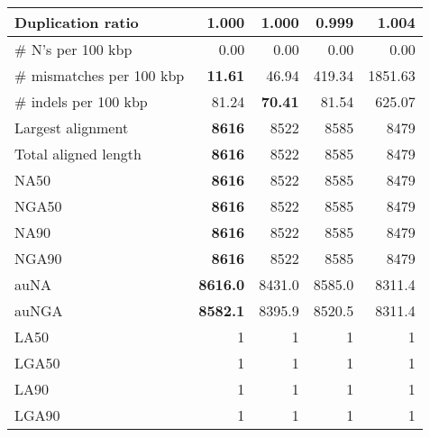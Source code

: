 \documentclass[12pt,a4paper]{article}
\begin{document}
\begin{table}[ht]
\begin{center}
\begin{tabular}{|l*{4}{|r}|}
Duplication ratio & 1.000 & 1.000 & {\bf 0.999} & 1.004 \\ \hline
\# N's per 100 kbp & 0.00 & 0.00 & 0.00 & 0.00 \\ \hline
\# mismatches per 100 kbp & {\bf 11.61} & 46.94 & 419.34 & 1851.63 \\ \hline
\# indels per 100 kbp & 81.24 & {\bf 70.41} & 81.54 & 625.07 \\ \hline
Largest alignment & {\bf 8616} & 8522 & 8585 & 8479 \\ \hline
Total aligned length & {\bf 8616} & 8522 & 8585 & 8479 \\ \hline
NA50 & {\bf 8616} & 8522 & 8585 & 8479 \\ \hline
NGA50 & {\bf 8616} & 8522 & 8585 & 8479 \\ \hline
NA90 & {\bf 8616} & 8522 & 8585 & 8479 \\ \hline
NGA90 & {\bf 8616} & 8522 & 8585 & 8479 \\ \hline
auNA & {\bf 8616.0} & 8431.0 & 8585.0 & 8311.4 \\ \hline
auNGA & {\bf 8582.1} & 8395.9 & 8520.5 & 8311.4 \\ \hline
LA50 & 1 & 1 & 1 & 1 \\ \hline
LGA50 & 1 & 1 & 1 & 1 \\ \hline
LA90 & 1 & 1 & 1 & 1 \\ \hline
LGA90 & 1 & 1 & 1 & 1 \\ \hline
\end{tabular}
\end{center}
\end{table}
\end{document}
